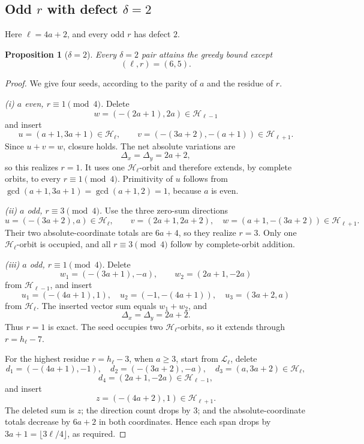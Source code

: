 \documentclass[11pt]{article}
\newtheorem{proposition}[theorem]{Proposition}
\theoremstyle{definition}
\newcommand{\HH}{\mathcal H}
\newcommand{\LL}{\mathcal L}
\begin{document}
\subsection{Odd \(r\) with defect \(\delta=2\)}

Here \(\ell=4a+2\), and every odd \(r\) has defect \(2\).

\begin{proposition}[\(\delta=2\)]\label{prop:delta2}
Every \(\delta=2\) pair attains the greedy bound except
\[
(\ell,r)=(6,5).
\]
\end{proposition}

\begin{proof}
We give four seeds, according to the parity of \(a\) and the residue of \(r\).

\smallskip
\noindent\emph{(i) \(a\) even, \(r\equiv1\pmod4\).}
Delete
\[
w=(-(2a+1),2a)\in\HH_{\ell-1}
\]
and insert
\[
u=(a+1,3a+1)\in\HH_\ell,\qquad
v=(-(3a+2),-(a+1))\in\HH_{\ell+1}.
\]
Since \(u+v=w\), closure holds.  The net absolute variations are
\[
\Delta_x=\Delta_y=2a+2,
\]
so this realizes \(r=1\).  It uses one \(\HH_\ell\)-orbit and therefore extends, by complete orbits, to every \(r\equiv1\pmod4\).  Primitivity of \(u\) follows from
\(\gcd(a+1,3a+1)=\gcd(a+1,2)=1\), because \(a\) is even.

\smallskip
\noindent\emph{(ii) \(a\) odd, \(r\equiv3\pmod4\).}
Use the three zero-sum directions
\[
u=(-(3a+2),a)\in\HH_\ell,\qquad
v=(2a+1,2a+2),\quad
w=(a+1,-(3a+2))\in\HH_{\ell+1}.
\]
Their two absolute-coordinate totals are \(6a+4\), so they realize \(r=3\).  Only one \(\HH_\ell\)-orbit is occupied, and all \(r\equiv3\pmod4\) follow by complete-orbit addition.

\smallskip
\noindent\emph{(iii) \(a\) odd, \(r\equiv1\pmod4\).}
Delete
\[
w_1=(-(3a+1),-a),\qquad
w_2=(2a+1,-2a)
\]
from \(\HH_{\ell-1}\), and insert
\[
u_1=(-(4a+1),1),\quad
u_2=(-1,-(4a+1)),\quad
u_3=(3a+2,a)
\]
from \(\HH_\ell\).  The inserted vector sum equals \(w_1+w_2\), and
\[
\Delta_x=\Delta_y=2a+2.
\]
Thus \(r=1\) is exact.  The seed occupies two \(\HH_\ell\)-orbits, so it extends through \(r=h_\ell-7\).

For the highest residue \(r=h_\ell-3\), when \(a\ge3\), start from \(\LL_\ell\), delete
\[
d_1=(-(4a+1),-1),\quad
d_2=(-(3a+2),-a),\quad
d_3=(a,3a+2)\in\HH_\ell,
\]
\[
d_4=(2a+1,-2a)\in\HH_{\ell-1},
\]
and insert
\[
z=(-(4a+2),1)\in\HH_{\ell+1}.
\]
The deleted sum is \(z\); the direction count drops by \(3\); and the absolute-coordinate totals decrease by \(6a+2\) in both coordinates.  Hence each span drops by
\(3a+1=\lfloor3\ell/4\rfloor\), as required.


\end{proof}
\end{document}
